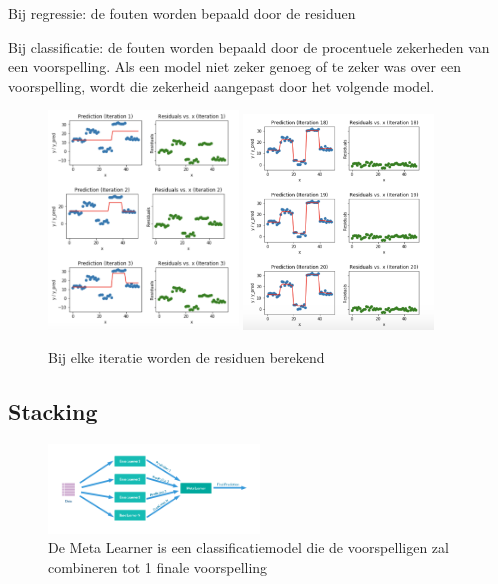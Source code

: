 \documentclass{article}
\begin{document}
Bij regressie: de fouten worden bepaald door de residuen

Bij classificatie: de fouten worden bepaald door de procentuele zekerheden van een voorspelling. Als een model niet zeker genoeg of te zeker was over een voorspelling, wordt die zekerheid aangepast door het volgende model.

\begin{figure}[H]
    \centering
    \includegraphics[width=0.45\textwidth]{gradient-boosting2.png}
    \includegraphics[width=0.45\textwidth]{gradient-boosting3.png}
    \caption{Bij elke iteratie worden de residuen berekend}
\end{figure}

\subsection{Stacking}

\begin{figure}[H]
    \centering
    \includegraphics[width=0.5\textwidth]{stacking.png}
    \caption{De Meta Learner is een classificatiemodel die de voorspelligen zal combineren tot 1 finale voorspelling}
\end{figure}
\end{document}
